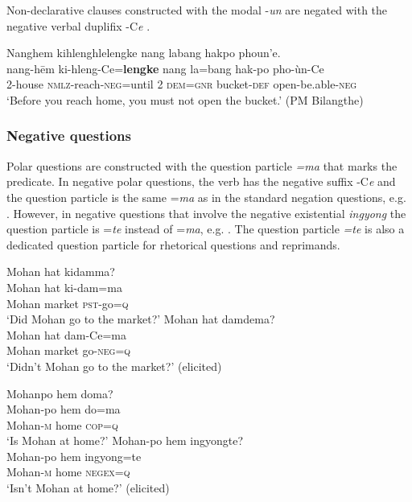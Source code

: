 \documentclass[output=paper,colorlinks,citecolor=brown]{langscibook}
\begin{document}
Non-declarative clauses constructed with the modal -\textit{un} are negated with the negative verbal duplifix -C\textit{e} . 

\ea\label{ex:amr:14} Nanghem kihlenghlelengke nang labang hakpo phoun’e.\\
    \gll nang-hēm ki-hleng-Ce=\textbf{lengke} nang la=bang hak-po pho-\`{u}n-Ce\\
         2-house \textsc{nmlz}{}-reach-\textsc{neg}=until 2 \textsc{dem}=\textsc{gnr} bucket-\textsc{def} open-be.able-\textsc{neg} \\
    \glt \textsc{‘}Before you reach home, you must not open the bucket.’ (PM Bilangthe)
\z

\subsubsection{Negative questions}\label{sec:amr:2.2.3} 
Polar questions are constructed with the question particle \textit{=ma} that marks the predicate. In negative polar questions, the verb has the negative suffix -C\textit{e} and the question particle is the same =\textit{ma} as in the standard negation questions, e.g. . However, in negative questions that involve the negative existential \textit{ingyong} the question particle is =\textit{te} instead of =\textit{ma}, e.g. . The question particle \textit{=te} is also a dedicated question particle for rhetorical questions and reprimands.

\ea\label{ex:amr:15}
    \ea\label{ex:amr:15a}  Mohan hat kidamma?  \\
        \gll Mohan hat ki-dam=ma \\
              Mohan market \textsc{pst}{}-go=\textsc{q} \\
        \glt ‘Did Mohan go to the market?’
    \ex\label{ex:amr:15b} Mohan hat damdema?  \\
        \gll Mohan hat dam-Ce=ma \\
              Mohan market go-\textsc{neg}=\textsc{q}\\
        \glt ‘Didn’t Mohan go to the market?’ (elicited)
    \z
\z 

\ea\label{ex:amr:16} 
    \ea\label{ex:amr:16a}Mohanpo hem doma?  \\ 
        \gll Mohan-po hem do=ma \\
              Mohan-\textsc{m} home \textsc{cop}=\textsc{q} \\
        \glt ‘Is Mohan at home?’ 
    \ex\label{ex:amr:16b} Mohan-po hem ingyongte?  \\
        \gll Mohan-po hem ingyong=te\\
              Mohan-\textsc{m} home \textsc{negex}=\textsc{q}\\
        \glt ‘Isn’t Mohan at home?’ (elicited)
    \z
\z 
\end{document}

